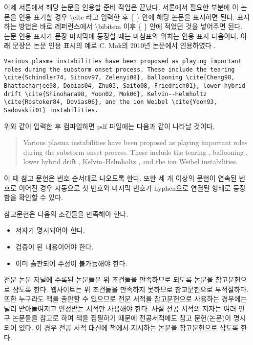 이제 서론에서 해당 논문을 인용할 준비 작업은 끝났다. 서론에서 필요한 부분에 이 논문을 인용 표기할 경우 {\textbackslash}cite 라고 입력한 후 \{ \} 안에 해당 논문을 표시하면 된다. 표시하는 방법은 바로 레퍼런스에서 {\textbackslash}bibitem 이후 \{ \} 안에 적었던 것을 넣어주면 된다. 논문 인용 표시가 문장 마지막에 등장할 때는 마침표의 위치는 인용 표시 다음이다. 아래 문장은 논문 인용 표시의 예로 C. Mok의 2010년 논문에서 인용하였다 \cite{Mok10}.
\begin{lstlisting}
Various plasma instabilities have been proposed as playing important roles during the substorm onset process. These include the tearing \cite{Schindler74, Sitnov97, Zelenyi08}, ballooning \cite{Cheng98, Bhattacharjee98, Dobias04, Zhu03, Saito08, Friedrich01}, lower hybrid drift \cite{Shinohara98, Yoon02, Mok06}, Kelvin--Helmholtz \cite{Rostoker84, Dovias06}, and the ion Weibel \cite{Yoon93, Sadovskii01} instabilities.
\end{lstlisting}
위와 같이 입력한 후 컴파일하면 pdf 파일에는 다음과 같이 나타날 것이다.
\begin{quote}
Various plasma instabilities have been proposed as playing important roles during the substorm onset process. These include the tearing \cite{Schindler74, Sitnov97, Zelenyi08}, ballooning \cite{Cheng98, Bhattacharjee98, Dobias04, Zhu03, Saito08, Friedrich01}, lower hybrid drift \cite{Shinohara98, Yoon02, Mok06}, Kelvin--Helmholtz \cite{Rostoker84, Dovias06}, and the ion Weibel \cite{Yoon93, Sadovskii01} instabilities.
\end{quote}
이 때 참고 문헌은 번호 순서대로 나오도록 한다. 또한 세 개 이상의 문헌이 연속된 
번호로 이어진 경우 자동으로 첫 번호와 마지막 번호가 hyphen으로 연결된 형태로 
등장함을 확인할 수 있다.


참고문헌은 다음의 조건들을 만족해야 한다.
\begin{itemize}
\item{저자가 명시되어야 한다.}
\item{검증이 된 내용이어야 한다.}
\item{이미 출판되어 수정이 불가능해야 한다.}
\end{itemize}
전문 논문 저널에 수록된 논문들은 위 조건들을 만족하므로 되도록 논문을 참고문헌으로 삼도록 한다. 웹사이트는 위 조건들을 만족하지 못하므로 참고문헌으로 부적절하다. 또한 누구라도 책을 출판할 수 있으므로 전문 서적을 참고문헌으로 사용하는 경우에는 널리 받아들여지고 인정받는 서적만 사용해야 한다. 사실 전공 서적의 저자는 여러 연구 논문들을 참고로 하여 책을 집필하기 때문에 전공서적에도 참고 문헌(논문)이 명시되어 있다. 이 경우 전공 서적 대신에 책에서 지시하는 논문을 참고문헌으로 삼도록 한다.

